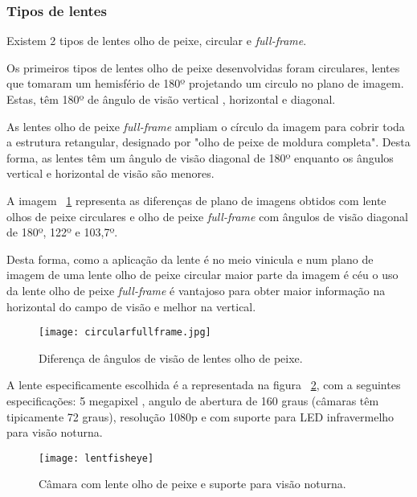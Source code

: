 \subsubsection{Tipos de lentes}

Existem 2 tipos de lentes olho de peixe, circular e \textit{full-frame}. 

Os primeiros tipos de lentes olho de peixe desenvolvidas foram circulares, lentes que tomaram um hemisfério de 180º projetando um circulo no plano de imagem. Estas, têm 180º de ângulo de visão vertical , horizontal e diagonal. 

As lentes olho de peixe \textit{full-frame} ampliam o círculo da imagem para cobrir toda a estrutura retangular, designado por "olho de peixe de moldura completa". Desta forma, as lentes têm um ângulo de visão diagonal de 180º enquanto os ângulos vertical e horizontal de visão são menores. 

A imagem ~\ref{fig:circularfullframe} representa as diferenças de plano de imagens obtidos com lente olhos de peixe circulares e olho de peixe \textit{full-frame} com ângulos de visão diagonal de 180º, 122º e 103,7º. 

Desta forma, como a aplicação da lente é no meio vinicula e num plano de imagem de uma lente olho de peixe circular maior parte da imagem é céu o uso da lente olho de peixe \textit{full-frame} é vantajoso para obter maior informação na horizontal do campo de visão e melhor na vertical.  

\begin{figure}[h!] %
	\begin{center}
		\leavevmode		
		\texttt{[image: circularfullframe.jpg]}
		\caption{Diferença de ângulos de visão de lentes olho de peixe.}
		\label{fig:circularfullframe}
	\end{center}
\end{figure}


A lente especificamente escolhida é a representada na figura ~\ref{fig:lentfisheye}, com a seguintes especificações: 5 megapixel , angulo de abertura de 160 graus (câmaras têm tipicamente 72 graus), resolução 1080p e com suporte para LED infravermelho para visão noturna.

\begin{figure}[h!]%
	\begin{center}
		\leavevmode		
		\texttt{[image: lentfisheye]}
		\caption{Câmara com lente olho de peixe e suporte para visão noturna.}
		\label{fig:lentfisheye}
	\end{center}
\end{figure}
